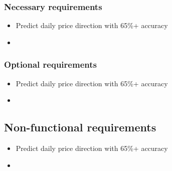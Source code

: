 \subsubsection{Necessary requirements}
\begin{itemize}
    \item Predict daily price direction with 65\%+ accuracy
    \item 
\end{itemize}
\subsubsection{Optional requirements}
\begin{itemize}
    \item Predict daily price direction with 65\%+ accuracy
    \item 
\end{itemize}
\subsection{Non-functional requirements}
\begin{itemize}
    \item Predict daily price direction with 65\%+ accuracy
    \item 
\end{itemize}